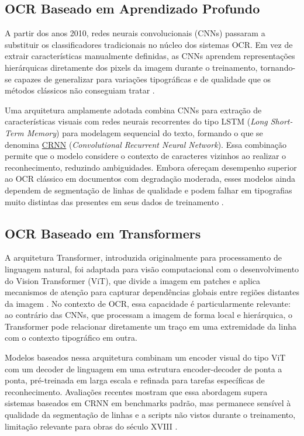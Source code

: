 \documentclass[
  12pt,
  oneside,
  a4paper,
  chapter=TITLE,
  section=TITLE,
  english,
  brazil
]{abntex2}
\begin{document}
\subsection{OCR Baseado em Aprendizado Profundo}

A partir dos anos 2010, redes neurais convolucionais (CNNs) passaram a substituir os
classificadores tradicionais no núcleo dos sistemas OCR. Em vez de extrair características
manualmente definidas, as CNNs aprendem representações hierárquicas diretamente dos
pixels da imagem durante o treinamento, tornando-se capazes de generalizar para variações
tipográficas e de qualidade que os métodos clássicos não conseguiam tratar
\cite{lombardi2020}.

Uma arquitetura amplamente adotada combina CNNs para extração de características visuais
com redes neurais recorrentes do tipo LSTM (\textit{Long Short-Term Memory}) para
modelagem sequencial do texto, formando o que se denomina
\href{https://arxiv.org/abs/1507.05717}{CRNN} (\textit{Convolutional Recurrent Neural
Network}). Essa combinação permite que o modelo considere o contexto de caracteres
vizinhos ao realizar o reconhecimento, reduzindo ambiguidades. Embora ofereçam desempenho
superior ao OCR clássico em documentos com degradação moderada, esses modelos ainda
dependem de segmentação de linhas de qualidade e podem falhar em tipografias muito
distintas das presentes em seus dados de treinamento \cite{dataunboxed2025}.

\subsection{OCR Baseado em Transformers}

A arquitetura Transformer, introduzida originalmente para processamento de linguagem
natural, foi adaptada para visão computacional com o desenvolvimento do Vision Transformer
(ViT), que divide a imagem em patches e aplica mecanismos de atenção para capturar
dependências globais entre regiões distantes da imagem \cite{huang2021}. No contexto de
OCR, essa capacidade é particularmente relevante: ao contrário das CNNs, que processam a
imagem de forma local e hierárquica, o Transformer pode relacionar diretamente um traço
em uma extremidade da linha com o contexto tipográfico em outra.

Modelos baseados nessa arquitetura combinam um encoder visual do tipo ViT com um decoder
de linguagem em uma estrutura encoder-decoder de ponta a ponta, pré-treinada em larga
escala e refinada para tarefas específicas de reconhecimento. Avaliações recentes mostram
que essa abordagem supera sistemas baseados em CRNN em benchmarks padrão, mas permanece
sensível à qualidade da segmentação de linhas e a scripts não vistos durante o
treinamento, limitação relevante para obras do século XVIII \cite{vesalainen2025}.
\end{document}
